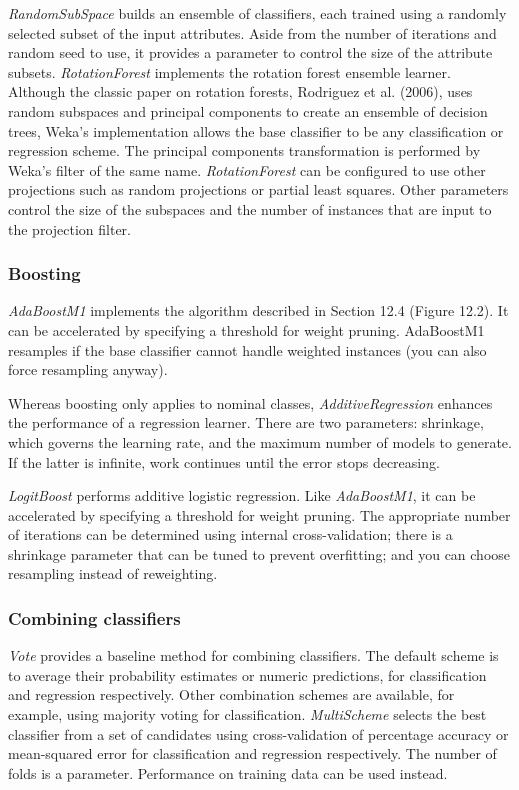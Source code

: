 \textit{RandomSubSpace} builds an ensemble of classifiers, each
trained using a randomly selected subset of the input
attributes. Aside from the number of iterations and random seed to
use, it provides a parameter to control the size of the attribute
subsets. \textit{RotationForest} implements the rotation forest
ensemble learner. Although the classic paper on rotation forests,
Rodriguez et al. (2006), uses random subspaces and principal
components to create an ensemble of decision trees, Weka's
implementation allows the base classifier to be any classification or
regression scheme. The principal components transformation is
performed by Weka's filter of the same name. \textit{RotationForest}
can be configured to use other projections such as random projections
or partial least squares. Other parameters control the size of the
subspaces and the number of instances that are input to the projection
filter.

\subsubsection{Boosting}

\textit{AdaBoostM1} implements the algorithm described in Section 12.4
(Figure 12.2). It can be accelerated by specifying a threshold for
weight pruning. AdaBoostM1 resamples if the base classifier cannot
handle weighted instances (you can also force resampling anyway).

Whereas boosting only applies to nominal classes,
\textit{AdditiveRegression} enhances the performance of a regression
learner. There are two parameters: shrinkage, which governs the
learning rate, and the maximum number of models to generate. If the
latter is infinite, work continues until the error stops decreasing.

\textit{LogitBoost} performs additive logistic regression. Like
\textit{AdaBoostM1}, it can be accelerated by specifying a threshold
for weight pruning. The appropriate number of iterations can be
determined using internal cross-validation; there is a shrinkage
parameter that can be tuned to prevent overfitting; and you can choose
resampling instead of reweighting.

\subsubsection{Combining classifiers}

\textit{Vote} provides a baseline method for combining
classifiers. The default scheme is to average their probability
estimates or numeric predictions, for classification and regression
respectively. Other combination schemes are available, for example,
using majority voting for classification. \textit{MultiScheme} selects
the best classifier from a set of candidates using cross-validation of
percentage accuracy or mean-squared error for classification and
regression respectively. The number of folds is a
parameter. Performance on training data can be used instead.

